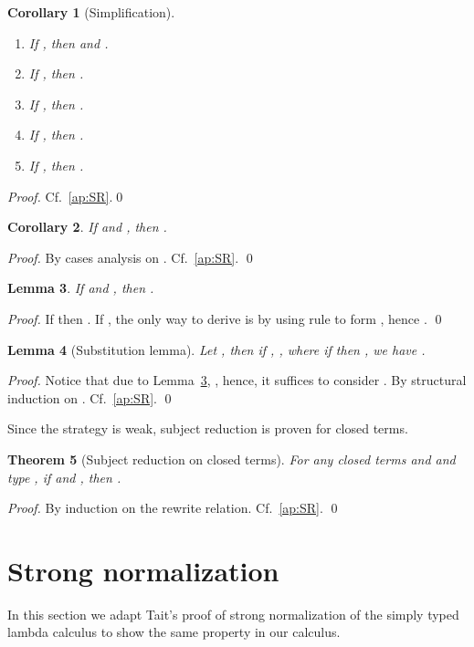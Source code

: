 \documentclass[preprint]{elsarticle}
\newtheorem{theorem}{Theorem}[section]
\newtheorem{lemma}[theorem]{Lemma}
\newtheorem{corollary}[theorem]{Corollary}
\begin{document}
\begin{corollary}[Simplification]\label{cor:simplification}~
  \begin{enumerate}
  \item If , then  and .
  \item If , then .
  \item If , then .
  \item If , then .
  \item If , then .
  \end{enumerate}
\end{corollary}
\begin{proof}
  Cf.~\ref{ap:SR}.\qed
\end{proof}

\begin{corollary}
  \label{cor:basisTermNoSup}
  If  and , then .
\end{corollary}
\begin{proof}
  By cases analysis on . Cf.~\ref{ap:SR}. \qed
\end{proof}

\begin{lemma}
  \label{lem:linearContext}
  If  and , then .
\end{lemma}
\begin{proof}
  If  then . If , the only way
  to derive  is by using rule  to form , hence
  .
  \qed
\end{proof}

\begin{lemma}[Substitution lemma]\label{lem:substitution}
  Let , then if , ,
  where if  then , we have .
\end{lemma}
\begin{proof}
  Notice that due to Lemma~\ref{lem:linearContext}, ,
  hence, it suffices to consider . By structural
  induction on . Cf.~\ref{ap:SR}.
  \qed
\end{proof}

Since the strategy is weak, subject reduction is proven for closed terms.

\begin{theorem}
  [Subject reduction on closed terms]
  \label{thm:SR}
  For any closed terms  and  and type , if  and , then .
\end{theorem}
\begin{proof}
  By induction on the rewrite relation. Cf.~\ref{ap:SR}.
  \qed
\end{proof}

\section{Strong normalization}\label{sec:SN}
In this section we adapt Tait's proof of strong normalization of the simply
typed lambda calculus to show the same property in our calculus.
\end{document}
